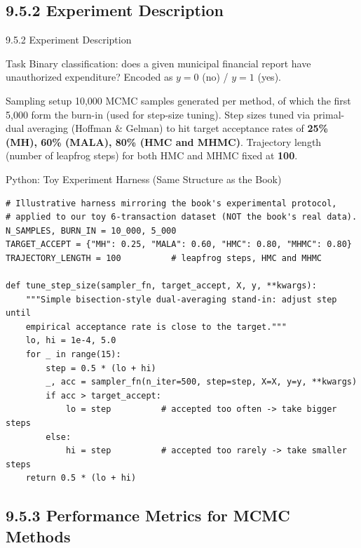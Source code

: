 \documentclass[aspectratio=169,10pt]{beamer}
\begin{document}
\subsection{9.5.2 Experiment Description}

\begin{frame}{9.5.2 Experiment Description}

\begin{block}{Task}
Binary classification: does a given municipal financial report have
unauthorized expenditure? Encoded as $y=0$ (no) / $y=1$ (yes).
\end{block}

\begin{block}{Sampling setup}
10{,}000 MCMC samples generated per method, of which the first 5{,}000
form the burn-in (used for step-size tuning). Step sizes tuned via
primal-dual averaging (Hoffman \& Gelman) to hit target acceptance rates
of \textbf{25\% (MH), 60\% (MALA), 80\% (HMC and MHMC)}. Trajectory length
(number of leapfrog steps) for both HMC and MHMC fixed at \textbf{100}.
\end{block}

\end{frame}

\begin{frame}[fragile]{Python: Toy Experiment Harness (Same Structure as the Book)}
\begin{lstlisting}
# Illustrative harness mirroring the book's experimental protocol,
# applied to our toy 6-transaction dataset (NOT the book's real data).
N_SAMPLES, BURN_IN = 10_000, 5_000
TARGET_ACCEPT = {"MH": 0.25, "MALA": 0.60, "HMC": 0.80, "MHMC": 0.80}
TRAJECTORY_LENGTH = 100          # leapfrog steps, HMC and MHMC

def tune_step_size(sampler_fn, target_accept, X, y, **kwargs):
    """Simple bisection-style dual-averaging stand-in: adjust step until
    empirical acceptance rate is close to the target."""
    lo, hi = 1e-4, 5.0
    for _ in range(15):
        step = 0.5 * (lo + hi)
        _, acc = sampler_fn(n_iter=500, step=step, X=X, y=y, **kwargs)
        if acc > target_accept:
            lo = step          # accepted too often -> take bigger steps
        else:
            hi = step          # accepted too rarely -> take smaller steps
    return 0.5 * (lo + hi)
\end{lstlisting}
\end{frame}

\subsection{9.5.3 Performance Metrics for MCMC Methods}
\end{document}
